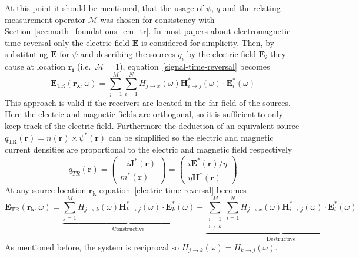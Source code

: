 At this point it should be mentioned, that the usage of \(\psi \), \(q\) and the relating measurement operator \(\mathcal{M}\) was chosen for consistency with Section~\ref{sec:math_foundations_em_tr}.
In most papers about electromagnetic time-reversal only the electric field \(\bm{E}\) is considered for simplicity.
Then, by substituting \(\bm{E}\) for \(\psi \) and describing the sources \(q_i\) by the electric field \(\bm{E}_i\) they cause at location \(\bm{r_i}\) (i.e.~\(\mathcal{M}=1\)), equation~\eqref{signal-time-reversal} becomes
\begin{equation}\label{electric-time-reversal}
    \bm{E}_{\text{TR}}(\bm{r_x}, \omega) = \sum_{j=1}^{M} \sum_{i=1}^{N} H_{j\rightarrow x}(\omega )  \bm{H}^*_{i\rightarrow j}(\omega) \cdot \bm{E}^*_i(\omega)
\end{equation}
This approach is valid if the receivers are located in the far-field of the sources.
Here the electric and magnetic fields are orthogonal, so it is sufficient to only keep track of the electric field.
Furthermore the deduction of an equivalent source \(q_{\text{TR}}(\bm{r}) = n(\bm{r}) \times \psi^*(\bm{r})\) can be simplified so the electric and magnetic current densities are proportional to the electric and magnetic field respectively~\parencite{de_rosny_theory_2010}
\begin{equation}
    q_{T R}(\bm{r})= \begin{pmatrix}
        -i \bm{J}^*(\bm{r}) \\
        m^*(\bm{r})
    \end{pmatrix} =\left(\begin{array}{c}
        i \bm{E}^*(\bm{r}) / \eta \\
        \eta \bm{H}^*(\bm{r})
        \end{array}\right)
\end{equation}
At any source location \(\bm{r_k}\) equation~\eqref{electric-time-reversal} becomes
\begin{equation}\label{electric-time-reversal-source}
    \bm{E}_{\text{TR}}(\bm{r_k}, \omega) = \underbrace{\sum_{j=1}^{M} H_{j\rightarrow k}(\omega) \bm{H}^*_{k\rightarrow j}(\omega) \cdot \bm{E}^*_k(\omega)}_{\text{Constructive}} + \underbrace{\sum_{\substack{i=1 \\ i \neq k}}^{M} \sum_{i=1}^{N} H_{j\rightarrow x}(\omega ) \bm{H}^*_{i\rightarrow j}(\omega) \cdot \bm{E}^*_i(\omega)}_{\text{Destructive}}
\end{equation}
As mentioned before, the system is reciprocal so \(H_{j\rightarrow k}(\omega )= H_{k\rightarrow j}(\omega )\). 
